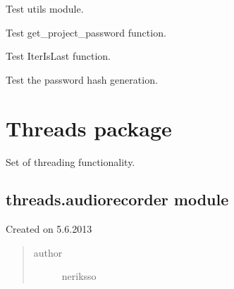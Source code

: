 \documentclass[letterpaper,10pt,english]{sphinxmanual}
\begin{document}
\begin{fulllineitems}
\label{testing:testing.TestUtils}
Test utils module.

\begin{fulllineitems}
\label{testing:testing.TestUtils.test_getpassword}
Test get\_project\_password function.

\end{fulllineitems}


\begin{fulllineitems}
\label{testing:testing.TestUtils.test_iterislast}
Test IterIsLast function.

\end{fulllineitems}


\begin{fulllineitems}
\label{testing:testing.TestUtils.test_passwordhash}
Test the password hash generation.

\end{fulllineitems}


\end{fulllineitems}



\section{Threads package}
\label{threads:threads-package}\label{threads::doc}
Set of threading functionality.


\subsection{threads.audiorecorder module}
\label{threads:threads-audiorecorder-module}\label{threads:module-threads.audiorecorder}
Created on 5.6.2013
\begin{quote}\begin{description}
\item[{author}] \leavevmode
neriksso

\end{description}\end{quote}
\end{document}
